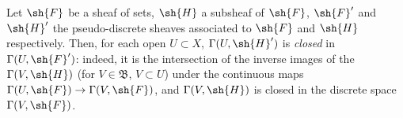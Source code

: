 \begin{env}[3.8.3]
\label{0.3.8.3}
Let $\sh{F}$ be a sheaf of sets, $\sh{H}$ a subsheaf of $\sh{F}$, $\sh{F}'$ and
$\sh{H}'$ the pseudo-discrete sheaves associated to $\sh{F}$ and $\sh{H}$
respectively. Then, for each open $U\subset X$, $\Gamma(U,\sh{H}')$ is
\emph{closed} in $\Gamma(U,\sh{F}')$: indeed, it is the intersection of the
inverse images of the $\Gamma(V,\sh{H})$ (for $V\in\mathfrak{B}$, $V\subset U$)
under the continuous maps $\Gamma(U,\sh{F})\to\Gamma(V,\sh{F})$, and
$\Gamma(V,\sh{H})$ is closed in the discrete space $\Gamma(V,\sh{F})$.
\end{env}

